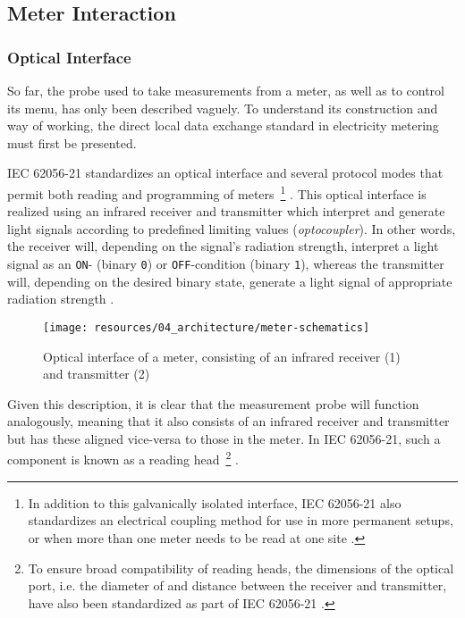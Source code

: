 \subsection{Meter Interaction}
\label{sec:meter-interaction}

\subsubsection{Optical Interface}
\label{sec:meter-interface}

So far, the probe used to take measurements from a meter, as well as to control its menu, has only been described vaguely. To understand its construction and way of working, the direct local data exchange standard in electricity metering must first be presented.

\acs{IEC} 62056-21 standardizes an optical interface and several protocol modes that permit both reading and programming of meters~\footnote{In addition to this galvanically isolated interface, \acs{IEC} 62056-21 also standardizes an electrical coupling method for use in more permanent setups, or when more than one meter needs to be read at one site \cite[p.~15]{iec2002d0}.} \cite[p.~15]{iec2002d0}. This optical interface is realized using an infrared receiver and transmitter which interpret and generate light signals according to predefined limiting values (\textit{optocoupler}). In other words, the receiver will, depending on the signal's radiation strength, interpret a light signal as an \texttt{ON}- (binary \texttt{0}) or \texttt{OFF}-condition (binary \texttt{1}), whereas the transmitter will, depending on the desired binary state, generate a light signal of appropriate radiation strength \cite[pp.~30--31]{iec2002d0}.

\begin{figure}[hbt]
  \centering
  \texttt{[image: resources/04\_architecture/meter-schematics]}
  \caption[Optical interface of a meter]{Optical interface of a meter, consisting of an infrared receiver (1) and transmitter (2) \cite[p.~7]{nzr2011ehz}}
  \label{fig:meter-schematics}
\end{figure}

\FloatBarrier

Given this description, it is clear that the measurement probe will function analogously, meaning that it also consists of an infrared receiver and transmitter but has these aligned vice-versa to those in the meter. In \acs{IEC} 62056-21, such a component is known as a reading head~\footnote{To ensure broad compatibility of reading heads, the dimensions of the optical port, i.e. the diameter of and distance between the receiver and transmitter, have also been standardized as part of \acs{IEC} 62056-21 \cite[p.~25]{iec2002d0}.} \cite[p.~29]{iec2002d0}.

